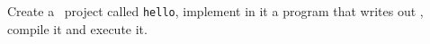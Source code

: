 Create a \csharp\ project called \texttt{hello}, implement in it a program that writes out , compile it and execute it.
